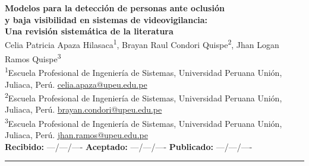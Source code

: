 \documentclass[12pt, a4paper]{article}
\begin{document}

{
\begin{center}
  {\LARGE\bfseries\color{azulPrincipal}
    Modelos para la detecci\'{o}n de personas ante oclusi\'{o}n\\
    y baja visibilidad en sistemas de videovigilancia:\\
    Una revisi\'{o}n sistem\'{a}tica de la literatura}\\[1em]

  {\large
    Celia Patricia Apaza Hilasaca\textsuperscript{1},\quad
    Brayan Raul Condori Quispe\textsuperscript{2},\quad
    Jhan Logan Ramos Quispe\textsuperscript{3}}\\[0.5em]

  {\small
    \textsuperscript{1}Escuela Profesional de Ingenier\'{i}a de Sistemas,
    Universidad Peruana Uni\'{o}n, Juliaca, Per\'{u}.
    \href{mailto:celia.apaza@upeu.edu.pe}{celia.apaza@upeu.edu.pe}\\
    \textsuperscript{2}Escuela Profesional de Ingenier\'{i}a de Sistemas,
    Universidad Peruana Uni\'{o}n, Juliaca, Per\'{u}.
    \href{mailto:brayan.condori@upeu.edu.pe}{brayan.condori@upeu.edu.pe}\\
    \textsuperscript{3}Escuela Profesional de Ingenier\'{i}a de Sistemas,
    Universidad Peruana Uni\'{o}n, Juliaca, Per\'{u}.
    \href{mailto:jhan.ramos@upeu.edu.pe}{jhan.ramos@upeu.edu.pe}}\\[0.8em]

  {\small\textbf{Recibido:} ---/---/---- \quad
         \textbf{Aceptado:} ---/---/---- \quad
         \textbf{Publicado:} ---/---/----}
\end{center}
}

\noindent\rule{\linewidth}{1pt}
\end{document}

